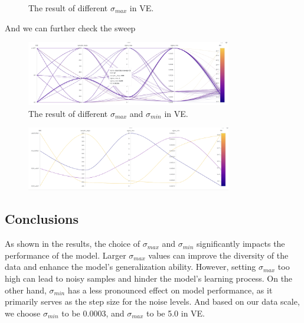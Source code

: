 \begin{figure}[htbp]
    \caption{The result of different $\sigma_{max}$ in VE.}
    \label{fig:ve_sigma_max}
\end{figure}


And we can further check the sweep

\begin{figure}[h!]
    \centering
    \includegraphics[width=0.8\textwidth]{Figures/sde_sweep.png}
    \caption{The result of different $\sigma_{max}$ and $\sigma_{min}$ in VE.}
\end{figure}

\begin{figure}
    \centering
    \includegraphics[width=0.8\textwidth]{Figures/sde_sweep_sigmamax.png}
    \caption{}
\end{figure}

\subsection{Conclusions}

As shown in the results, the choice of $\sigma_{max}$ and $\sigma_{min}$ significantly impacts the performance of the model. Larger $\sigma_{max}$ values can improve the diversity of the data and enhance the model's generalization ability. However, setting $\sigma_{max}$ too high can lead to noisy samples and hinder the model's learning process. On the other hand, $\sigma_{min}$ has a less pronounced effect on model performance, as it primarily serves as the step size for the noise levels. And based on our data scale, we choose $\sigma_{min}$ to be 0.0003, and $\sigma_{max}$ to be 5.0 in VE.

